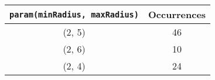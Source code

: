 \documentclass[letterpaper, 12pt]{article}
\begin{document}
\begin{longtable}{|c|c|}
\hline
\textbf{\texttt{param(minRadius, maxRadius)}} & \textbf{Occurrences} \\
\hline
(2, 5) & 46 \\
\hline
(2, 6) & 10 \\
\hline
(2, 4) & 24 \\
\hline
\end{longtable}
\end{document}
